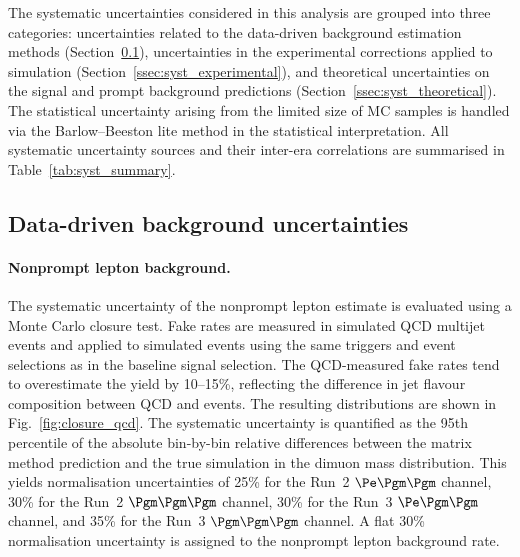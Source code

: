 The systematic uncertainties considered in this analysis are grouped into three categories: uncertainties related to the data-driven background estimation methods (Section~\ref{ssec:syst_datadriven}), uncertainties in the experimental corrections applied to simulation (Section~\ref{ssec:syst_experimental}), and theoretical uncertainties on the signal and prompt background predictions (Section~\ref{ssec:syst_theoretical}). The statistical uncertainty arising from the limited size of MC samples is handled via the Barlow--Beeston lite method in the statistical interpretation. All systematic uncertainty sources and their inter-era correlations are summarised in Table~\ref{tab:syst_summary}.

\subsection{Data-driven background uncertainties}
\label{ssec:syst_datadriven}

\paragraph{Nonprompt lepton background.}
The systematic uncertainty of the nonprompt lepton estimate is evaluated using a Monte Carlo closure test. Fake rates are measured in simulated QCD multijet events and applied to simulated \ttbar events using the same triggers and event selections as in the baseline signal selection. The QCD-measured fake rates tend to overestimate the \ttbar yield by 10--15\%, reflecting the difference in jet flavour composition between QCD and \ttbar events. The resulting distributions are shown in Fig.~\ref{fig:closure_qcd}. The systematic uncertainty is quantified as the 95th percentile of the absolute bin-by-bin relative differences between the matrix method prediction and the true \ttbar simulation in the dimuon mass distribution. This yields normalisation uncertainties of 25\% for the Run~2 $\Pe\Pgm\Pgm$ channel, 30\% for the Run~2 $\Pgm\Pgm\Pgm$ channel, 30\% for the Run~3 $\Pe\Pgm\Pgm$ channel, and 35\% for the Run~3 $\Pgm\Pgm\Pgm$ channel. A flat 30\% normalisation uncertainty is assigned to the nonprompt lepton background rate.


